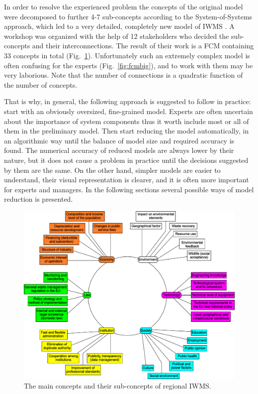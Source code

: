 \documentclass[graybox]{svmult}
\begin{document}
In order to resolve the experienced problem the concepts of the original model were decomposed to further 4-7 sub-concepts according to the System-of-Systems approach, which led to a very detailed, completely new model of IWMS \cite{buruzs2013modeling}. A workshop was organized with the help of 12 stakeholders who decided the sub-concepts and their interconnections. The result of their work is a FCM containing 33 concepts in total (Fig.~\ref{fig:flower}). Unfortunately such an extremely complex model is often confusing for the experts (Fig.~\ref{fig:fcmbig}), and to work with them  may be very laborious. Note that the number of connections is a quadratic function of the number of concepts.

That is why, in general, the following approach is suggested to follow in practice: start with an obviously oversized, fine-grained model. Experts are often uncertain about the importance of system components thus it worth include most or all of them in the preliminary model. Then start reducing the model automatically, in an algorithmic way until the balance of model size and required accuracy is found. The numerical accuracy of reduced models are always lower by their nature, but it does not cause a problem in practice until the decisions suggested by them are the same. On the other hand, simpler models are easier to understand, their visual representation is clearer, and it is often more important for experts and managers. In the following sections several possible ways of model reduction is presented.

\begin{figure}[hbt]
  \begin{center}
    \includegraphics[width=\textwidth]{szines_virag.pdf}
  \end{center}
  \caption{The main concepts and their sub-concepts of regional IWMS.}
  \label{fig:flower}
\end{figure}
\end{document}
